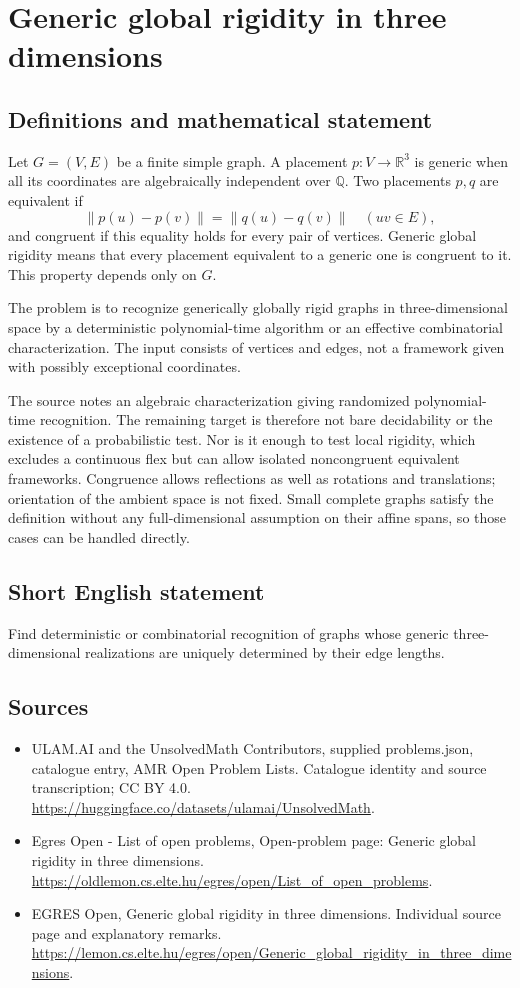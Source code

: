 \documentclass[11pt,a4paper]{article}
\begin{document}
\section*{Generic global rigidity in three dimensions}\label{statement}

\subsection{Definitions and mathematical statement}
Let $G=(V,E)$ be a finite simple graph. A placement $p:V\to\mathbb R^3$
is generic when all its coordinates are algebraically independent
over $\mathbb Q$. Two placements $p,q$ are equivalent if
\[
                       \|p(u)-p(v)\|=\|q(u)-q(v)\|
                                           \quad(uv\in E),
\]
and congruent if this equality holds for every pair of vertices.
Generic global rigidity means that every placement equivalent to a
generic one is congruent to it. This property depends only on $G$.

The problem is to recognize generically globally rigid graphs in
three-dimensional space by a deterministic polynomial-time algorithm
or an effective combinatorial characterization. The input consists of
vertices and edges, not a framework given with possibly exceptional
coordinates.

The source notes an algebraic characterization giving randomized
polynomial-time recognition. The remaining target is therefore not
bare decidability or the existence of a probabilistic test. Nor is it
enough to test local rigidity, which excludes a continuous flex but can
allow isolated noncongruent equivalent frameworks. Congruence allows
reflections as well as rotations and translations; orientation of the
ambient space is not fixed. Small complete graphs satisfy the definition
without any full-dimensional assumption on their affine spans, so
those cases can be handled directly.
\subsection{Short English statement}
Find deterministic or combinatorial recognition of graphs whose
generic three-dimensional realizations are uniquely determined by their edge lengths.
\subsection{Sources}
\begin{itemize}
\item[S1] ULAM.AI and the UnsolvedMath Contributors, supplied problems.json, catalogue entry, AMR Open Problem Lists. Catalogue identity and source transcription; CC BY 4.0.
\url{https://huggingface.co/datasets/ulamai/UnsolvedMath}.
\item[S2] Egres Open - List of open problems, Open-problem page: Generic global rigidity in three dimensions. 
\url{https://oldlemon.cs.elte.hu/egres/open/List_of_open_problems}.
\item[S3] EGRES Open, Generic global rigidity in three dimensions. Individual source page and explanatory remarks.
\url{https://lemon.cs.elte.hu/egres/open/Generic_global_rigidity_in_three_dimensions}.
\end{itemize}
\end{document}
